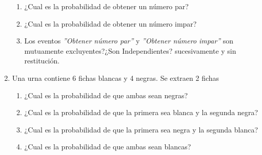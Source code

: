 \begin{enumerate}
\begin{enumerate}
\item ¿Cual es la probabilidad de obtener un número par?
\item ¿Cual es la probabilidad de obtener un número impar?
\item Los eventos \textit{''Obtener número par''} y \textit{''Obtener número impar''} son mutuamente excluyentes?¿Son Independientes?
 sucesivamente y sin restitución.
\end{enumerate}
\item Una urna contiene 6 fichas blancas y 4 negras. Se extraen 2 fichas
\begin{enumerate}
\item ¿Cual es la probabilidad de que ambas sean negras?
\item ¿Cual es la probabilidad de que la primera sea blanca y la segunda negra?
\item ¿Cual es la probabilidad de que la primera sea negra y la segunda blanca?
\item ¿Cual es la probabilidad de que ambas sean blancas?
\end{enumerate}
\end{enumerate}
